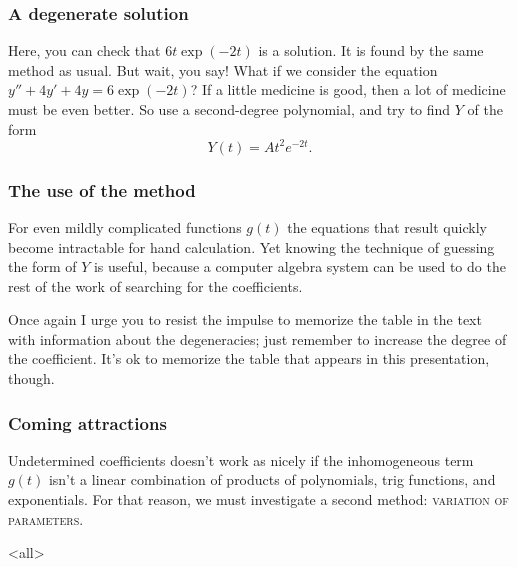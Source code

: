 \begin{frame}

\frametitle{A degenerate solution}
\label{adegeneratesolution}

Here, you can check that $ 6t \exp{(-2t)} $ is a solution. It is found by the same method as usual. But wait, you say!
 \pause 
What if we consider the equation $ y'' + 4y' + 4y = 6 \exp{(-2t)} $?
 \pause 
If a little medicine is good, then a lot of medicine must be even better. So use a second-degree polynomial, and try to find $ Y $ of the form
\[
    Y(t) = At^2 e^{-2t}.    
\]

\end{frame}

\begin{frame}

\frametitle{The use of the method}
\label{theuseofthemethod}

For even mildly complicated functions $ g(t) $ the equations that result quickly become intractable for hand calculation. Yet knowing the technique of guessing the form of $ Y $ is useful, because a computer algebra system can be used to do the rest of the work of searching for the coefficients.

Once again I urge you to resist the impulse to memorize the table in the text with information about the degeneracies; just remember to increase the degree of the coefficient. It's ok to memorize the table that appears in this presentation, though.

\end{frame}

\begin{frame}

\frametitle{Coming attractions}
\label{comingattractions}

Undetermined coefficients doesn't work as nicely if the inhomogeneous term $ g(t) $ isn't a linear combination of products of polynomials, trig functions, and exponentials. For that reason, we must investigate a second method: \textsc{variation of parameters.}

\end{frame}

\mode<all>


\mode*


